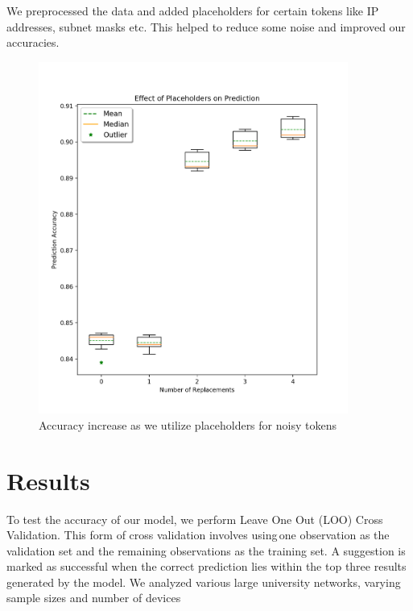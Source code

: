 We preprocessed the data and added placeholders for certain tokens like IP addresses, subnet masks etc. This helped to reduce some noise and improved our accuracies.
\begin{figure}[H]
	\centering
	\includegraphics[width=4in]{replacement_analysis.png}
	\caption{Accuracy increase as we utilize placeholders for noisy tokens}
\end{figure}

\section{Results}

To test the accuracy of our model, we perform Leave One Out (LOO) Cross Validation. This form of cross validation involves using one observation as the validation set and the remaining observations as the training set. A suggestion is marked as successful when the correct prediction lies within the top three results generated by the model. We analyzed various large university networks, varying sample sizes and number of devices\\


